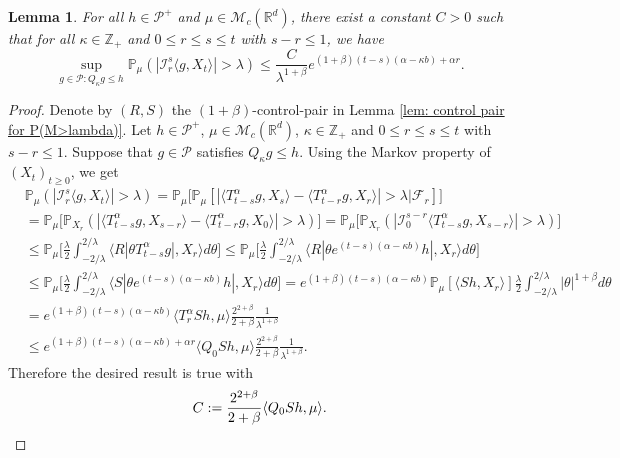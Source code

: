 \documentclass[12pt]{amsart}
\theoremstyle{plain}
\newtheorem{lem}[thm]{Lemma}
\theoremstyle{definition}
\numberwithin{equation}{section}
\begin{document}
\begin{lem}\label{lem: temp}
	For all $h \in \mathcal P^+$ and $\mu \in \mathcal M_c(\mathbb{R}^d)$, there exist a constant $C > 0$ such that for all $\kappa \in \mathbb Z_+ $ and $0\leq r\leq s\leq t$ with $s-r \leq 1$, we have
\[
    \sup_{g \in \mathcal P: Q_\kappa g\leq h}\mathbb P_{\mu}(|\mathcal I_r^s\langle g, X_t\rangle|>\lambda)
    \leq \frac{ C}{\lambda^{1+\beta}} e^{(1+\beta)(t-s)(\alpha- \kappa b)+ \alpha r}.
\]
\end{lem}
\begin{proof}
    Denote by $(R,S)$ the $(1+\beta)$-control-pair in Lemma \ref{lem: control pair for P(M>lambda)}.
    Let $h \in \mathcal P^+$, $\mu \in \mathcal M_c(\mathbb{R}^d)$, $\kappa \in \mathbb Z_+ $ and $0\leq r\leq s\leq t$ with $s-r \leq 1$.
    Suppose that $g\in \mathcal P$ satisfies $Q_\kappa g \leq h$.
    Using the Markov property of $(X_t)_{t\geq 0}$, we get
\begin{align}
    &\mathbb P_{\mu}(|\mathcal I_r^s\langle g, X_t\rangle|>\lambda)
    = \mathbb P_\mu \big[\mathbb P_\mu[|\langle T_{t-s}^\alpha g, X_{s}\rangle - \langle T_{t-r}^\alpha g, X_{r}\rangle|> \lambda\big| \mathscr F_r]\big]
    \\&= \mathbb P_\mu \big[\mathbb P_{X_r}(|\langle T_{t-s}^\alpha g, X_{s-r}\rangle - \langle T_{t-r}^\alpha g, X_{0}\rangle|> \lambda)\big]
    = \mathbb P_\mu \big[\mathbb P_{X_r}(|\mathcal I_0^{s-r}\langle T_{t-s}^\alpha g, X_{s-r}\rangle |> \lambda)\big]
    \\&\leq \mathbb P_\mu \Big[ \frac{\lambda}{2}\int_{-2/\lambda}^{2/\lambda}\langle R|\theta T^\alpha_{t-s}g|,X_r\rangle d\theta \Big]
    \leq \mathbb P_\mu \Big[ \frac{\lambda}{2}\int_{-2/\lambda}^{2/\lambda}\langle R|\theta e^{(t-s)(\alpha- \kappa b)}h|,X_r\rangle d\theta \Big]
	\\&\leq \mathbb P_\mu \Big[ \frac{\lambda}{2}\int_{-2/\lambda}^{2/\lambda}\langle S|\theta e^{(t-s)(\alpha- \kappa b)}h|,X_r\rangle d\theta \Big]
    = e^{(1+\beta)(t-s)(\alpha- \kappa b)} \mathbb P_\mu [ \langle Sh,X_r\rangle ] \frac{\lambda}{2}\int_{-2/\lambda}^{2/\lambda}|\theta|^{1+\beta}d\theta
    \\& = e^{(1+\beta)(t-s)(\alpha- \kappa b)} \langle T_r^\alpha Sh,\mu\rangle  \frac{2^{2+\beta}}{2+\beta}\frac{1}{\lambda^{1+\beta}}
    \\&\leq e^{(1+\beta)(t-s)(\alpha- \kappa b)+ \alpha r} \langle Q_0 Sh,\mu\rangle  \frac{2^{2+\beta}}{2+\beta}\frac{1}{\lambda^{1+\beta}}.
\end{align}
    Therefore the desired result is true with
\[
    C := \frac{2^{2+\beta}}{2+\beta}\langle Q_0Sh, \mu\rangle.
    \qedhere
\]
\end{proof}
\end{document}
